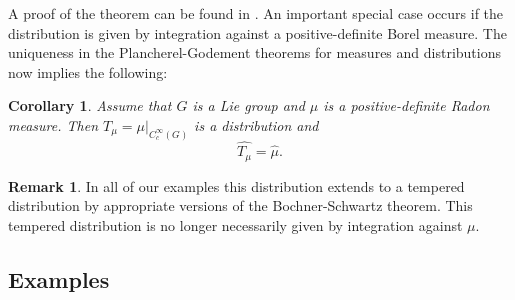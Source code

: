 \documentclass[12pt,reqno,a4paper]{amsart}
\theoremstyle{theorem}
\newtheorem{corollary}[theorem]{Corollary}
\theoremstyle{definition}
\newtheorem{remark}[theorem]{Remark}
\numberwithin{theorem}{section}
\numberwithin{equation}{section}
\begin{document}
A proof of the theorem can be found in \cite{BarkerThesis}.
An important special case occurs if the distribution is given by integration against a positive-definite Borel measure.
The uniqueness in the Plancherel-Godement theorems for measures and distributions now implies the following:
\begin{corollary}\label{c:distributional_plancherel-godement_is_measure_plancherel_godement}
	Assume that $G$ is a Lie group and $\mu$ is a positive-definite Radon measure. Then  $T_\mu=\mu|_{C_c^\infty(G)}$ is a distribution and
	\[\widehat{T_\mu} = \widehat{\mu}.\]
\end{corollary}
\begin{remark}
	In all of our examples this distribution extends to a tempered distribution by appropriate versions of the Bochner-Schwartz theorem. This tempered distribution is no longer necessarily given by integration against $\mu$.
\end{remark}
\subsection{Examples}
\end{document}
